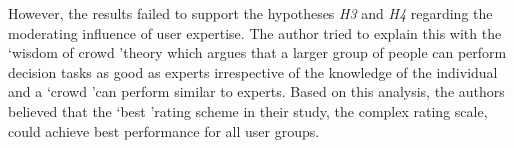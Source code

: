 However, the results failed to support the hypotheses \emph{H3} and \emph{H4} regarding the moderating influence of user expertise. The author tried to explain this with the \lq wisdom of crowd \rq theory which argues that a larger group of people can perform decision tasks as good
as experts irrespective of the knowledge of the individual and a \lq crowd \rq can perform similar to experts. Based on this analysis, the authors believed that the \lq best \rq rating scheme in their study, the complex rating scale, could achieve best performance for all user groups.




